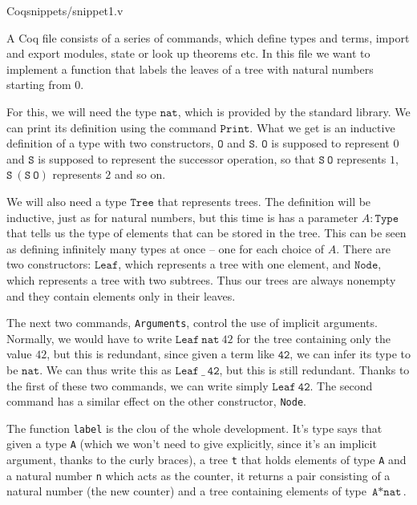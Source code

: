 \documentclass[declaration,inz,english,shortabstract]{iithesis}
\newcommand{\m}[1]{\texttt{#1}}
\newcommand{\nat}{\texttt{nat}}
\begin{document}

\begin{inputminted}
[
    frame=lines,
    bgcolor=CoqIDE,
    linenos
]
{Coq}{snippets/snippet1.v}
\end{inputminted}

A Coq file consists of a series of commands, which define types and terms, import and export modules, state or look up theorems etc. In this file we want to implement a function that labels the leaves of a tree with natural numbers starting from $0$.

For this, we will need the type $\m{nat}$, which is provided by the standard library. We can print its definition using the command $\m{Print}$. What we get is an inductive definition of a type with two constructors, $\m{O}$ and $\m{S}$. $\m{O}$ is supposed to represent $0$ and $\m{S}$ is supposed to represent the successor operation, so that $\m{S}\ \m{O}$ represents $1$, $\m{S}\ (\m{S}\ \m{O})$ represents $2$ and so on.

We will also need a type $\m{Tree}$ that represents trees. The definition will be inductive, just as for natural numbers, but this time is has a parameter $A : \m{Type}$ that tells us the type of elements that can be stored in the tree. This can be seen as defining infinitely many types at once -- one for each choice of $A$. There are two constructors: $\m{Leaf}$, which represents a tree with one element, and $\m{Node}$, which represents a tree with two subtrees. Thus our trees are always nonempty and they contain elements only in their leaves.

The next two commands, \m{Arguments}, control the use of implicit arguments. Normally, we would have to write $\m{Leaf}\ \nat\ 42$ for the tree containing only the value $42$, but this is redundant, since given a term like $\m{42}$, we can infer its type to be $\nat$. We can thus write this as $\m{Leaf}\ \_\ \m{42}$, but this is still redundant. Thanks to the first of these two commands, we can write simply $\m{Leaf}\ \m{42}$. The second command has a similar effect on the other constructor, \m{Node}.

The function \m{label} is the clou of the whole development. It's type says that given a type \m{A} (which we won't need to give explicitly, since it's an implicit argument, thanks to the curly braces), a tree \m{t} that holds elements of type \m{A} and a natural number \m{n} which acts as the counter, it returns a pair consisting of a natural number (the new counter) and a tree containing elements of type $\m{A} * \nat$.
\end{document}
